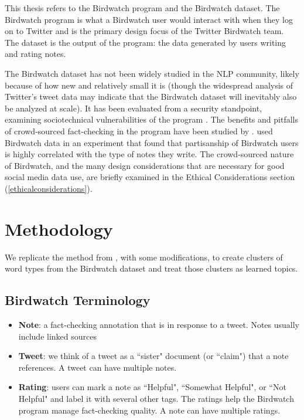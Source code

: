 \documentclass [11pt, proquest] {uwthesis}[2020/02/24]
\begin{document}
This thesis refers to the Birdwatch program and
the Birdwatch dataset. The Birdwatch program is
what a Birdwatch user would interact with when
they log on to Twitter and is the primary design
focus of the Twitter Birdwatch team. The dataset is
the output of the program: the data generated by
users writing and rating notes.

The Birdwatch dataset has not been widely studied in the NLP community, likely because of how new and relatively small it is (though the widespread analysis of Twitter's tweet data \citep{antonakaki2021survey} may indicate that the Birdwatch dataset will inevitably also be analyzed at scale). It has been evaluated from a security standpoint, examining sociotechnical vulnerabilities of the program \citep{benjamin2021watches}. The benefits and pitfalls of crowd-sourced fact-checking in the program have been studied by \cite{yasseri2021can}. \cite{allen2021birds} used Birdwatch data in an experiment that found that partisanship of Birdwatch users is highly correlated with the type of notes they write. The crowd-sourced nature of Birdwatch, and the many design considerations that are necessary for good social media data use, are briefly examined in the Ethical Considerations section (\ref{ethicalconsiderations}).


\chapter{Methodology}

We replicate the method from \cite{sia-etal-2020-tired}, with some modifications, to create clusters of word types from the Birdwatch dataset and treat those clusters as learned topics.

\section{Birdwatch Terminology}


\begin{itemize}
\item \textbf{Note}: a fact-checking annotation that is in response to a tweet. Notes usually include linked sources
\item \textbf{Tweet}: we think of a tweet as a ``sister" document (or ``claim") that a note references. A tweet can have multiple notes.
\item \textbf{Rating}: users can mark a note as ``Helpful", ``Somewhat Helpful", or ``Not Helpful" and label it with several other tags. The ratings help the Birdwatch program manage fact-checking quality. A note can have multiple ratings.
\end{itemize}
\end{document}
